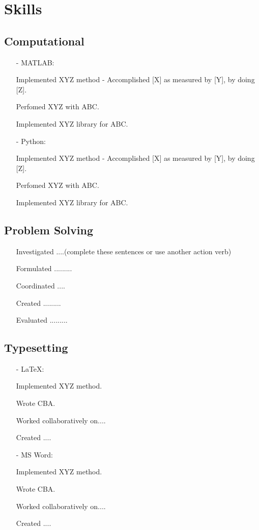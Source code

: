 \documentclass[11pt]{article}
\begin{document}
    \section{Skills}

    \subsection{Computational}
    \begin{itemize}
        \item[-] \textcolor{Sepia}{MATLAB}:
        \item[\checkmark] Implemented XYZ method - Accomplished [X] as measured by [Y], by doing [Z].  
        \item[\checkmark] Perfomed XYZ with ABC. 
        \item[\checkmark] Implemented XYZ library for ABC. 
        \item[-] \textcolor{Sepia}{Python}: 
        \item[\checkmark] Implemented XYZ method - Accomplished [X] as measured by [Y], by doing [Z].  
        \item[\checkmark] Perfomed XYZ with ABC. 
        \item[\checkmark] Implemented XYZ library for ABC.
    \end{itemize}
    \subsection{Problem Solving}
    \begin{itemize}
        \item[\checkmark] Investigated ....(complete these sentences or use another action verb)
        \item[\checkmark] Formulated .........
        \item[\checkmark] Coordinated ....
        \item[\checkmark] Created .........
        \item[\checkmark] Evaluated .........
    \end{itemize}
    \subsection{Typesetting}
    \begin{itemize}
        \item[-] \textcolor{Sepia}{\LaTeX}: 
        \item[\checkmark] Implemented XYZ method. 
        \item[\checkmark] Wrote CBA. 
        \item[\checkmark] Worked collaboratively on.... 
        \item[\checkmark] Created ....
        \item[-] \textcolor{Sepia}{MS Word}:  
        \item[\checkmark] Implemented XYZ method. 
        \item[\checkmark] Wrote CBA. 
        \item[\checkmark] Worked collaboratively on.... 
        \item[\checkmark] Created ....
    \end{itemize}
\end{document}
